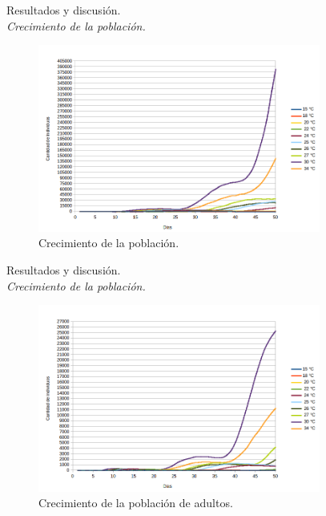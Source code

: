 
\begin{frame}[t]{Resultados y discusión.\\\textit{Crecimiento de la población.}}
\begin{center}
    \begin{figure}
    \includegraphics[width=9.3cm]{../paper/graphics/evolucion-poblacion-all.png}
    \caption{Crecimiento de la población.}
    \end{figure}
\end{center}
\end{frame}

\begin{frame}[t]{Resultados y discusión.\\\textit{Crecimiento de la población.}}
\begin{center}
    \begin{figure}
    \includegraphics[width=9.3cm]{../paper/graphics/evolucion-poblacion-adultos.png}
    \caption{Crecimiento de la población de adultos.}
    \end{figure}
\end{center}
\end{frame}


